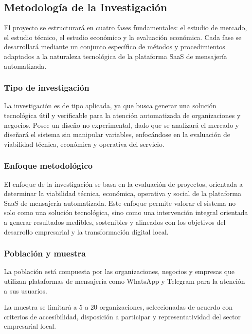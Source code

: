\subsection{Metodología de la Investigación}

El proyecto se estructurará en cuatro fases fundamentales: el estudio de mercado, el estudio técnico, el estudio económico y la evaluación económica. Cada fase se desarrollará mediante un conjunto específico de métodos y procedimientos adaptados a la naturaleza tecnológica de la plataforma SaaS de mensajería automatizada.

\subsubsection{Tipo de investigación}
La investigación es de tipo aplicada, ya que busca generar una solución tecnológica útil y verificable para la atención automatizada de organizaciones y negocios. Posee un diseño no experimental, dado que se analizará el mercado y diseñará el sistema sin manipular variables, enfocándose en la evaluación de viabilidad técnica, económica y operativa del servicio.

\subsubsection{Enfoque metodológico}
El enfoque de la investigación se basa en la evaluación de proyectos, orientada a determinar la viabilidad técnica, económica, operativa y social de la plataforma SaaS de mensajería automatizada. Este enfoque permite valorar el sistema no solo como una solución tecnológica, sino como una intervención integral orientada a generar resultados medibles, sostenibles y alineados con los objetivos del desarrollo empresarial y la transformación digital local.

\subsubsection{Población y muestra}
La población está compuesta por las organizaciones, negocios y empresas que utilizan plataformas de mensajería como WhatsApp y Telegram para la atención a sus usuarios.

La muestra se limitará a 5 a 20 organizaciones, seleccionadas de acuerdo con criterios de accesibilidad, disposición a participar y representatividad del sector empresarial local.

